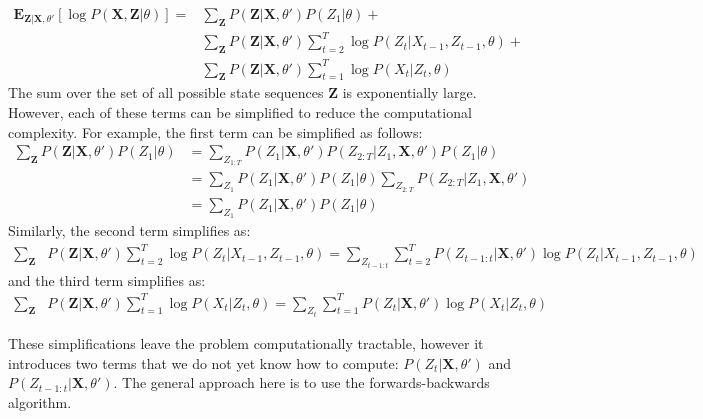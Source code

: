 \documentclass{amsart}
\theoremstyle{definition}
\theoremstyle{remark}
\numberwithin{equation}{section}
\begin{document}
\begin{align*}
\textbf{E}_{\textbf{Z}|\textbf{X},\theta'} \left[\log{P(\textbf{X},\textbf{Z}|\theta)}\right] = &\sum_\textbf{Z} P(\textbf{Z}|\textbf{X},\theta')P(Z_1|\theta) + \\
&\sum_\textbf{Z} P(\textbf{Z}|\textbf{X},\theta')\sum_{t=2}^T \log P(Z_t|X_{t-1}, Z_{t-1},\theta) + \\
&\sum_\textbf{Z} P(\textbf{Z}|\textbf{X},\theta')\sum_{t=1}^T \log P(X_t|Z_t,\theta)
\end{align*}
The sum over the set of all possible state sequences $\textbf{Z}$ is exponentially large. However, each of these terms can be simplified to reduce the computational complexity. For example, the first term can be simplified as follows:
\begin{align*}
\sum_\textbf{Z} P(\textbf{Z}|\textbf{X},\theta')P(Z_1|\theta) &= \sum_{Z_{1:T}} P(Z_1|\textbf{X},\theta')P(Z_{2:T}|Z_1,\textbf{X},\theta')P(Z_1|\theta)\\
&= \sum_{Z_1} P(Z_1|\textbf{X},\theta')P(Z_1|\theta)\sum_{Z_{2:T}} P(Z_{2:T}|Z_1,\textbf{X},\theta')\\
&= \sum_{Z_1} P(Z_1|\textbf{X},\theta')P(Z_1|\theta)
\end{align*}
Similarly, the second term simplifies as:
\begin{align*}
\sum_\textbf{Z}& P(\textbf{Z}|\textbf{X},\theta')\sum_{t=2}^T \log P(Z_t|X_{t-1}, Z_{t-1},\theta) = \sum_{Z_{t-1:t}}\sum_{t=2}^T P(Z_{t-1:t}|\textbf{X},\theta') \log P(Z_t|X_{t-1}, Z_{t-1},\theta)
\end{align*}
and the third term simplifies as:
\begin{align*}
\sum_\textbf{Z}& P(\textbf{Z}|\textbf{X},\theta')\sum_{t=1}^T \log P(X_t|Z_t,\theta) = \sum_{Z_t}\sum_{t=1}^T P(Z_t|\textbf{X},\theta') \log P(X_t|Z_t,\theta)
\end{align*}

These simplifications leave the problem computationally tractable, however it introduces two terms that we do not yet know how to compute: $P(Z_t|\textbf{X},\theta')$ and $P(Z_{t-1:t}|\textbf{X},\theta')$. The general approach here is to use the forwards-backwards algorithm.
\end{document}
